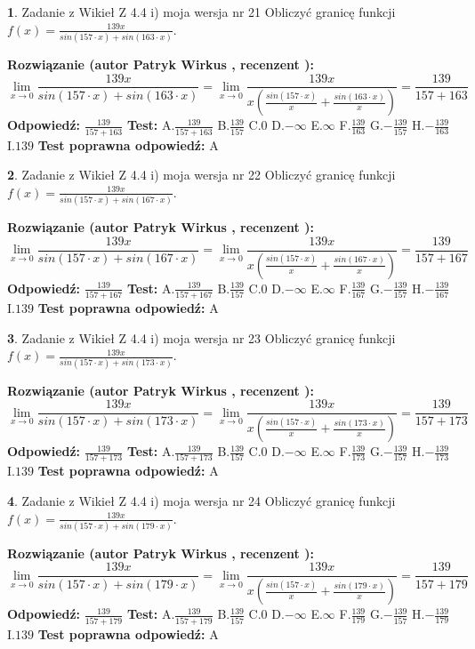 \documentclass[12pt, a4paper]{article}
\theoremstyle{definition} %
\newtheorem{zad}{}
\newcommand{\zadStart}[1]{\begin{zad}#1\newline}
\newcommand{\zadStop}{\end{zad}}
\newcommand{\rozwStart}[2]{\noindent \textbf{Rozwiązanie (autor #1 , recenzent #2): }\newline}
\newcommand{\rozwStop}{\newline}
\newcommand{\odpStart}{\noindent \textbf{Odpowiedź:}\newline}
\newcommand{\odpStop}{\newline}
\newcommand{\testStart}{\noindent \textbf{Test:}\newline}
\newcommand{\testStop}{\newline}
\newcommand{\kluczStart}{\noindent \textbf{Test poprawna odpowiedź:}\newline}
\newcommand{\kluczStop}{\newline}
\begin{document}
\zadStart{Zadanie z Wikieł Z 4.4 i) moja wersja nr 21}
Obliczyć granicę funkcji $f(x)=\frac{139x}{sin(157\cdot x) +sin(163\cdot x)}$.
\zadStop
\rozwStart{Patryk Wirkus}{}
$$\lim\limits_{x\to 0}\frac{139x}{sin(157\cdot x) +sin(163\cdot x)}=\lim\limits_{x\to 0}\frac{139x}{x(\frac{sin(157\cdot x)}{x}+\frac{sin(163\cdot x)}{x})}=\frac{139}{157+163}$$
\rozwStop
\odpStart
$\frac{139}{157+163}$
\odpStop
\testStart
A.$\frac{139}{157+163}$
B.$\frac{139}{157}$
C.$0$
D.$-\infty$
E.$\infty$
F.$\frac{139}{163}$
G.$-\frac{139}{157}$
H.$-\frac{139}{163}$
I.$139$
\testStop
\kluczStart
A
\kluczStop



\zadStart{Zadanie z Wikieł Z 4.4 i) moja wersja nr 22}
Obliczyć granicę funkcji $f(x)=\frac{139x}{sin(157\cdot x) +sin(167\cdot x)}$.
\zadStop
\rozwStart{Patryk Wirkus}{}
$$\lim\limits_{x\to 0}\frac{139x}{sin(157\cdot x) +sin(167\cdot x)}=\lim\limits_{x\to 0}\frac{139x}{x(\frac{sin(157\cdot x)}{x}+\frac{sin(167\cdot x)}{x})}=\frac{139}{157+167}$$
\rozwStop
\odpStart
$\frac{139}{157+167}$
\odpStop
\testStart
A.$\frac{139}{157+167}$
B.$\frac{139}{157}$
C.$0$
D.$-\infty$
E.$\infty$
F.$\frac{139}{167}$
G.$-\frac{139}{157}$
H.$-\frac{139}{167}$
I.$139$
\testStop
\kluczStart
A
\kluczStop



\zadStart{Zadanie z Wikieł Z 4.4 i) moja wersja nr 23}
Obliczyć granicę funkcji $f(x)=\frac{139x}{sin(157\cdot x) +sin(173\cdot x)}$.
\zadStop
\rozwStart{Patryk Wirkus}{}
$$\lim\limits_{x\to 0}\frac{139x}{sin(157\cdot x) +sin(173\cdot x)}=\lim\limits_{x\to 0}\frac{139x}{x(\frac{sin(157\cdot x)}{x}+\frac{sin(173\cdot x)}{x})}=\frac{139}{157+173}$$
\rozwStop
\odpStart
$\frac{139}{157+173}$
\odpStop
\testStart
A.$\frac{139}{157+173}$
B.$\frac{139}{157}$
C.$0$
D.$-\infty$
E.$\infty$
F.$\frac{139}{173}$
G.$-\frac{139}{157}$
H.$-\frac{139}{173}$
I.$139$
\testStop
\kluczStart
A
\kluczStop



\zadStart{Zadanie z Wikieł Z 4.4 i) moja wersja nr 24}
Obliczyć granicę funkcji $f(x)=\frac{139x}{sin(157\cdot x) +sin(179\cdot x)}$.
\zadStop
\rozwStart{Patryk Wirkus}{}
$$\lim\limits_{x\to 0}\frac{139x}{sin(157\cdot x) +sin(179\cdot x)}=\lim\limits_{x\to 0}\frac{139x}{x(\frac{sin(157\cdot x)}{x}+\frac{sin(179\cdot x)}{x})}=\frac{139}{157+179}$$
\rozwStop
\odpStart
$\frac{139}{157+179}$
\odpStop
\testStart
A.$\frac{139}{157+179}$
B.$\frac{139}{157}$
C.$0$
D.$-\infty$
E.$\infty$
F.$\frac{139}{179}$
G.$-\frac{139}{157}$
H.$-\frac{139}{179}$
I.$139$
\testStop
\kluczStart
A
\kluczStop
\end{document}
